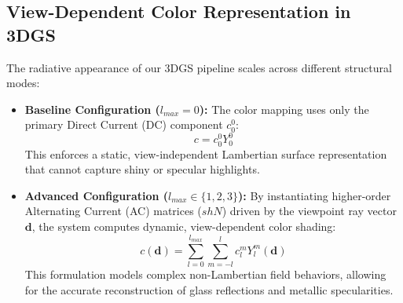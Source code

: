 \documentclass{article}
\begin{document}
\subsection{View-Dependent Color Representation in 3DGS}
The radiative appearance of our 3DGS pipeline scales across different structural modes:
\begin{itemize}
    \item \textbf{Baseline Configuration ($l_{max}=0$):} The color mapping uses only the primary Direct Current (DC) component $c_0^0$:
    \begin{equation}
        c = c_0^0 Y_0^0
    \end{equation}
    This enforces a static, view-independent Lambertian surface representation that cannot capture shiny or specular highlights.
    \item \textbf{Advanced Configuration ($l_{max} \in \{1,2,3\}$):} By instantiating higher-order Alternating Current (AC) matrices ($shN$) driven by the viewpoint ray vector $\mathbf{d}$, the system computes dynamic, view-dependent color shading:
    \begin{equation}
        c(\mathbf{d}) = \sum_{l=0}^{l_{max}} \sum_{m=-l}^{l} c_{l}^{m} Y_{l}^{m}(\mathbf{d})
    \end{equation}
    This formulation models complex non-Lambertian field behaviors, allowing for the accurate reconstruction of glass reflections and metallic specularities.
\end{itemize}
\end{document}
